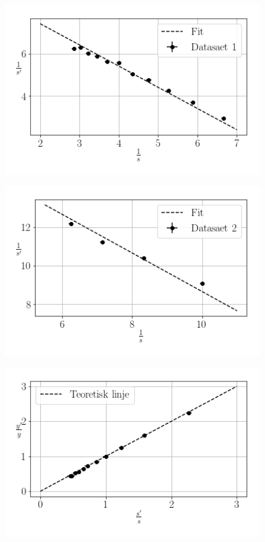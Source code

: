 \begin{figure}[H]
    \includegraphics[width=\linewidth]{1.png}
    \caption{}
    \label{fig:1}
\end{figure}

\begin{figure}[H]
    \includegraphics[width=\linewidth]{2.png}
    \caption{}
    \label{fig:2}
\end{figure}

\begin{figure}[H]
    \includegraphics[width=\linewidth]{3.png}
    \caption{}
    \label{fig:3}
\end{figure}
